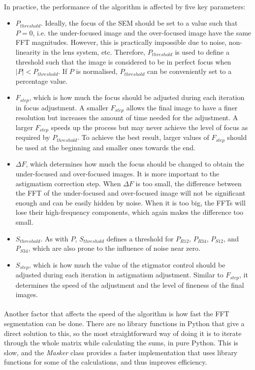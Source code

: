 \documentclass[12pt, twocolumn]{report}
\begin{document}
\paragraph{}
In practice, the performance of the algorithm is affected by five key parameters:
\begin{itemize}
    \item $P_{threshold}$. Ideally, the focus of the SEM should be set to a value such that $P = 0$, i.e. the under-focused image and the over-focused image have the same FFT magnitudes. However, this is practically impossible due to noise, non-linearity in the lens system, etc. Therefore, $P_{threshold}$ is used to define a threshold such that the image is considered to be in perfect focus when $|P| < P_{threshold}$. If $P$ is normalised, $P_{threshold}$ can be conveniently set to a percentage value.
    \item $F_{step}$, which is how much the focus should be adjusted during each iteration in focus adjustment. A smaller $F_{step}$ allows the final image to have a finer resolution but increases the amount of time needed for the adjustment. A larger $F_{step}$ speeds up the process but may never achieve the level of focus as required by $P_{threshold}$. To achieve the best result, larger values of $F_{step}$ should be used at the beginning and smaller ones towards the end.
    \item $\Delta F$, which determines how much the focus should be changed to obtain the under-focused and over-focused images. It is more important to the astigmatism correction step. When $\Delta F$ is too small, the difference between the FFT of the under-focused and over-focused image will not be significant enough and can be easily hidden by noise. When it is too big, the FFTs will lose their high-frequency components, which again makes the difference too small.
    \item $S_{threshold}$. As with $P$, $S_{threshold}$ defines a threshold for $P_{R12}$, $P_{R34}$, $P_{S12}$, and $P_{S34}$, which are also prone to the influence of noise near zero.
    \item $S_{step}$, which is how much the value of the stigmator control should be adjusted during each iteration in astigmatism adjustment. Similar to $F_{step}$, it determines the speed of the adjustment and the level of fineness of the final images.
\end{itemize}

\paragraph{}
Another factor that affects the speed of the algorithm is how fast the FFT segmentation can be done. There are no library functions in Python that give a direct solution to this, so the most straightforward way of doing it is to iterate through the whole matrix while calculating the sums, in pure Python. This is slow, and the \textit{Masker} class provides a faster implementation that uses library functions for some of the calculations, and thus improves efficiency.
\end{document}
